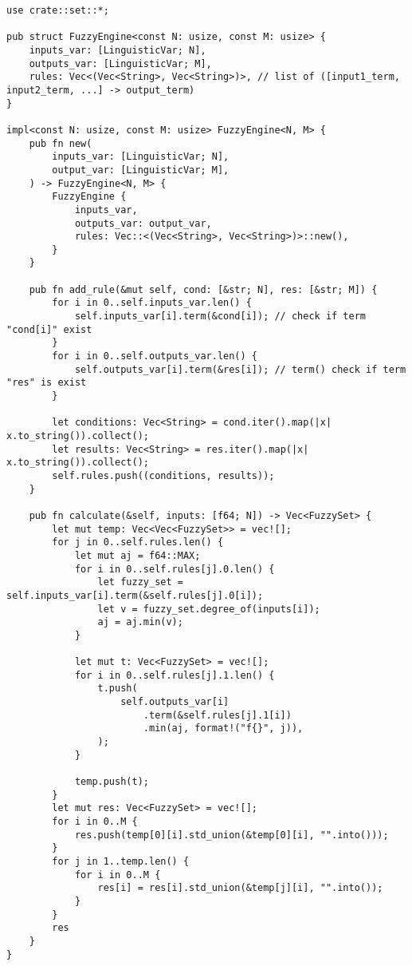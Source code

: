 \begin{verbatim}
use crate::set::*;

pub struct FuzzyEngine<const N: usize, const M: usize> {
    inputs_var: [LinguisticVar; N],
    outputs_var: [LinguisticVar; M],
    rules: Vec<(Vec<String>, Vec<String>)>, // list of ([input1_term, input2_term, ...] -> output_term)
}

impl<const N: usize, const M: usize> FuzzyEngine<N, M> {
    pub fn new(
        inputs_var: [LinguisticVar; N],
        output_var: [LinguisticVar; M],
    ) -> FuzzyEngine<N, M> {
        FuzzyEngine {
            inputs_var,
            outputs_var: output_var,
            rules: Vec::<(Vec<String>, Vec<String>)>::new(),
        }
    }

    pub fn add_rule(&mut self, cond: [&str; N], res: [&str; M]) {
        for i in 0..self.inputs_var.len() {
            self.inputs_var[i].term(&cond[i]); // check if term "cond[i]" exist
        }
        for i in 0..self.outputs_var.len() {
            self.outputs_var[i].term(&res[i]); // term() check if term "res" is exist
        }

        let conditions: Vec<String> = cond.iter().map(|x| x.to_string()).collect();
        let results: Vec<String> = res.iter().map(|x| x.to_string()).collect();
        self.rules.push((conditions, results));
    }

    pub fn calculate(&self, inputs: [f64; N]) -> Vec<FuzzySet> {
        let mut temp: Vec<Vec<FuzzySet>> = vec![];
        for j in 0..self.rules.len() {
            let mut aj = f64::MAX;
            for i in 0..self.rules[j].0.len() {
                let fuzzy_set = self.inputs_var[i].term(&self.rules[j].0[i]);
                let v = fuzzy_set.degree_of(inputs[i]);
                aj = aj.min(v);
            }

            let mut t: Vec<FuzzySet> = vec![];
            for i in 0..self.rules[j].1.len() {
                t.push(
                    self.outputs_var[i]
                        .term(&self.rules[j].1[i])
                        .min(aj, format!("f{}", j)),
                );
            }

            temp.push(t);
        }
        let mut res: Vec<FuzzySet> = vec![];
        for i in 0..M {
            res.push(temp[0][i].std_union(&temp[0][i], "".into()));
        }
        for j in 1..temp.len() {
            for i in 0..M {
                res[i] = res[i].std_union(&temp[j][i], "".into());
            }
        }
        res
    }
}


\end{verbatim}
